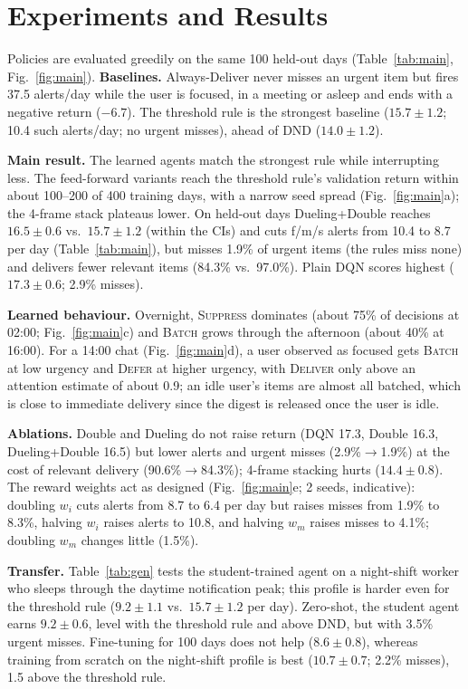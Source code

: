 \documentclass[conference,10pt]{IEEEtran}
\begin{document}
\section{Experiments and Results}
Policies are evaluated greedily on the same 100 held-out days (Table~\ref{tab:main}, Fig.~\ref{fig:main}). \textbf{Baselines.} Always-Deliver never misses an urgent item but fires 37.5 alerts/day while the user is focused, in a meeting or asleep and ends with a negative return ($-6.7$). The threshold rule is the strongest baseline ($15.7\pm1.2$; 10.4 such alerts/day; no urgent misses), ahead of DND ($14.0\pm1.2$).

\textbf{Main result.} The learned agents match the strongest rule while interrupting less. The feed-forward variants reach the threshold rule's validation return within about 100--200 of 400 training days, with a narrow seed spread (Fig.~\ref{fig:main}a); the 4-frame stack plateaus lower. On held-out days Dueling+Double reaches $16.5\pm0.6$ vs.\ $15.7\pm1.2$ (within the CIs) and cuts f/m/s alerts from 10.4 to 8.7 per day (Table~\ref{tab:main}), but misses 1.9\% of urgent items (the rules miss none) and delivers fewer relevant items (84.3\% vs.\ 97.0\%). Plain DQN scores highest ($17.3\pm0.6$; 2.9\% misses).

\textbf{Learned behaviour.} Overnight, \textsc{Suppress} dominates (about 75\% of decisions at 02:00; Fig.~\ref{fig:main}c) and \textsc{Batch} grows through the afternoon (about 40\% at 16:00). For a 14:00 chat (Fig.~\ref{fig:main}d), a user observed as focused gets \textsc{Batch} at low urgency and \textsc{Defer} at higher urgency, with \textsc{Deliver} only above an attention estimate of about 0.9; an idle user's items are almost all batched, which is close to immediate delivery since the digest is released once the user is idle.

\textbf{Ablations.} Double and Dueling do not raise return (DQN 17.3, Double 16.3, Dueling+Double 16.5) but lower alerts and urgent misses (2.9\%$\to$1.9\%) at the cost of relevant delivery (90.6\%$\to$84.3\%); 4-frame stacking hurts ($14.4\pm0.8$). The reward weights act as designed (Fig.~\ref{fig:main}e; 2 seeds, indicative): doubling $w_i$ cuts alerts from 8.7 to 6.4 per day but raises misses from 1.9\% to 8.3\%, halving $w_i$ raises alerts to 10.8, and halving $w_m$ raises misses to 4.1\%; doubling $w_m$ changes little (1.5\%).

\textbf{Transfer.} Table~\ref{tab:gen} tests the student-trained agent on a night-shift worker who sleeps through the daytime notification peak; this profile is harder even for the threshold rule ($9.2\pm1.1$ vs.\ $15.7\pm1.2$ per day). Zero-shot, the student agent earns $9.2\pm0.6$, level with the threshold rule and above DND, but with 3.5\% urgent misses. Fine-tuning for 100 days does not help ($8.6\pm0.8$), whereas training from scratch on the night-shift profile is best ($10.7\pm0.7$; 2.2\% misses), 1.5 above the threshold rule.
\end{document}
